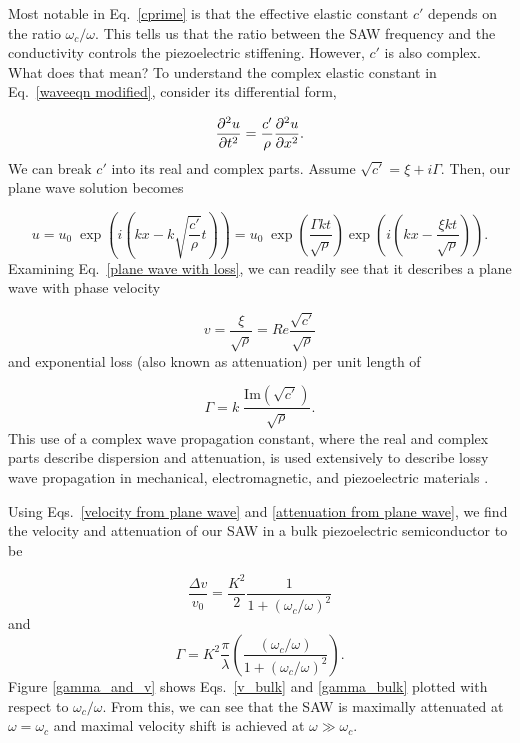 \documentclass{beavtex_dub_edit}
\begin{document}
Most notable in Eq.\ \ref{cprime} is that the effective elastic constant $c'$ depends on the ratio $\omega_c/\omega$. This tells us that the ratio between the SAW frequency and the conductivity controls the piezoelectric stiffening. However, $c'$ is also complex. What does that mean? To understand the complex elastic constant in Eq.\ \ref{waveeqn modified}, consider its differential form,

\begin{equation}
    \pdv[2]{u}{t} = \frac{c'}{\rho} \pdv[2]{u}{x}.
\end{equation}
We can break $c'$ into its real and complex parts. Assume $\sqrt{c'} = \xi + i\Gamma$. Then, our plane wave solution becomes

\begin{equation}
    u = u_0 \; \exp\left(i(kx-k\sqrt{\frac{c'}{\rho}}t)\right)
    = u_0 \; \exp\left(\frac{\Gamma k t}{\sqrt{\rho}}\right) \exp\left(i(kx - \frac{\xi kt}{\sqrt{\rho}})\right). \label{plane wave with loss}
\end{equation}
Examining Eq.\ \ref{plane wave with loss}, we can readily see that it describes a plane wave with phase velocity 

\begin{equation}
    v = \frac{\xi}{\sqrt{\rho}} = Re{\frac{\sqrt{c'}}{\sqrt{\rho}}} \label{velocity from plane wave}
\end{equation} 
and exponential loss (also known as attenuation) per unit length of 

\begin{equation}
    \Gamma = k \; \frac{\mathrm{Im}(\sqrt{c'})}{\sqrt{\rho}}. \label{attenuation from plane wave}
\end{equation} 
This use of a complex wave propagation constant, where the real and complex parts describe dispersion and attenuation, is used extensively to describe lossy wave propagation in mechanical, electromagnetic, and piezoelectric materials \cite{holland_representation_1967} \cite[p.\ 18]{pozar_microwave_2012} \cite{weinreich_acoustodynamic_1956, gonzalez_revisiting_2016}. 

Using Eqs.\ \ref{velocity from plane wave} and \ref{attenuation from plane wave}, we find the velocity and attenuation of our SAW in a bulk piezoelectric semiconductor to be

\begin{equation}
    \frac{\Delta v}{v_0} = \frac{K^2}{2}\frac{1}{1+(\omega_c/\omega)^2} \label{v_bulk}
\end{equation}
and
\begin{equation}
    \Gamma = K^2 \frac{\pi}{\lambda}\left(\frac{(\omega_c/\omega)}{1+(\omega_c/\omega)^2}\right). \label{gamma_bulk}
\end{equation}
Figure \ref{gamma_and_v} shows Eqs.\ \ref{v_bulk} and \ref{gamma_bulk} plotted with respect to  $\omega_c/\omega$. From this, we can see that the SAW is maximally attenuated at $\omega = \omega_c$ and maximal velocity shift is achieved at $\omega \gg \omega_c$.
\end{document}
